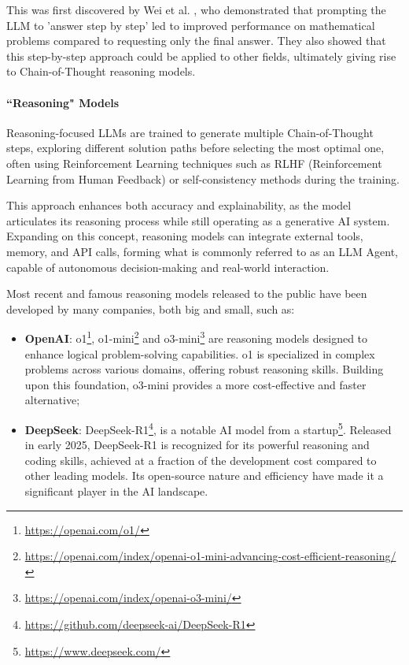 This was first discovered by Wei et al.
\cite{wei2023chainofthoughtpromptingelicitsreasoning}, who demonstrated that prompting
the LLM to 'answer step by step' led to improved performance on mathematical problems
compared to requesting only the final answer. They also showed that this step-by-step
approach could be applied to other fields, ultimately giving rise to Chain-of-Thought
reasoning models.

\paragraph{``Reasoning" Models}
Reasoning-focused LLMs are trained to generate multiple Chain-of-Thought steps, exploring
different solution paths before selecting the most optimal one, often using
Reinforcement Learning
\cite{deepseekai2025deepseekr1incentivizingreasoningcapability} techniques such
as RLHF (Reinforcement Learning from Human Feedback) or self-consistency methods
during the training.

This approach enhances both accuracy and explainability, as the model articulates
its reasoning process while still operating as a generative AI system. Expanding
on this concept, reasoning models can integrate external tools, memory, and API calls,
forming what is commonly referred to as an LLM Agent, capable of autonomous decision-making
and real-world interaction.

Most recent and famous reasoning models released to the public have been developed
by many companies, both big and small, such as:
\begin{itemize}
  \item \textbf{OpenAI}: o1\footnote{\url{https://openai.com/o1/}}, o1-mini\footnote{\url{https://openai.com/index/openai-o1-mini-advancing-cost-efficient-reasoning/}}
    and o3-mini\footnote{\url{https://openai.com/index/openai-o3-mini/}} are reasoning
    models designed to enhance logical problem-solving capabilities. o1 is
    specialized in complex problems across various domains, offering robust reasoning
    skills. Building upon this foundation, o3-mini provides a more cost-effective
    and faster alternative;

  \item \textbf{DeepSeek}: DeepSeek-R1\footnote{\url{https://github.com/deepseek-ai/DeepSeek-R1}},
    is a notable AI model from a startup\footnote{\url{https://www.deepseek.com/}}.
    Released in early 2025, DeepSeek-R1 is recognized for its powerful reasoning
    and coding skills, achieved at a fraction of the development cost compared to
    other leading models. Its open-source nature and efficiency have made it a
    significant player in the AI landscape.
\end{itemize}

